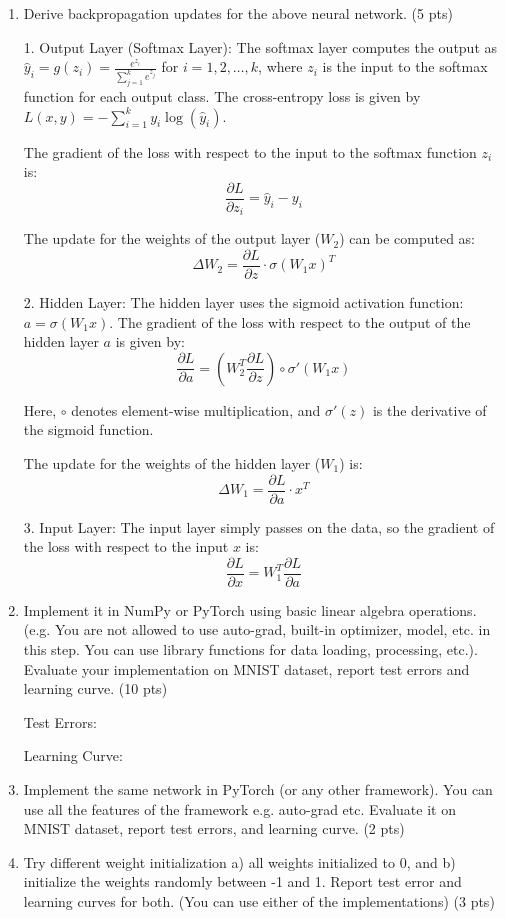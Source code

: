 \documentclass[a4paper]{article}
\theoremstyle{definition}
\newenvironment{soln}{
    \leavevmode\color{blue}\ignorespaces
}{}
\begin{document}
\begin{enumerate}
    \item Derive backpropagation updates for the above neural network. (5 pts) \\
    \begin{soln}
        1. Output Layer (Softmax Layer):
            The softmax layer computes the output as \(\hat{y}_i = g(z_i) = \frac{e^{z_i}}{\sum_{j=1}^k e^{z_j}}\) for \(i = 1, 2, \ldots, k\), where \(z_i\) is the input to the softmax function for each output class. The cross-entropy loss is given by \(L(x, y) = -\sum_{i=1}^k y_i \log(\hat{y}_i)\).

            The gradient of the loss with respect to the input to the softmax function \(z_i\) is:
            \[ \frac{\partial L}{\partial z_i} = \hat{y}_i - y_i \]

            The update for the weights of the output layer (\(W_2\)) can be computed as:
            \[ \Delta W_2 = \frac{\partial L}{\partial z} \cdot \sigma(W_1 x)^T \]

        2. Hidden Layer:
            The hidden layer uses the sigmoid activation function: \(a = \sigma(W_1 x)\). The gradient of the loss with respect to the output of the hidden layer \(a\) is given by:
            \[ \frac{\partial L}{\partial a} = (W_2^T \frac{\partial L}{\partial z}) \circ \sigma'(W_1 x) \]

            Here, \(\circ\) denotes element-wise multiplication, and \(\sigma'(z)\) is the derivative of the sigmoid function.

            The update for the weights of the hidden layer (\(W_1\)) is:
            \[ \Delta W_1 = \frac{\partial L}{\partial a} \cdot x^T \]

        3. Input Layer:
            The input layer simply passes on the data, so the gradient of the loss with respect to the input \(x\) is:
            \[ \frac{\partial L}{\partial x} = W_1^T \frac{\partial L}{\partial a} \]

    \end{soln}
    \item Implement it in NumPy or PyTorch using basic linear algebra operations. (e.g. You are not allowed to use auto-grad, built-in optimizer, model, etc. in this step. You can use library functions for data loading, processing, etc.). Evaluate your implementation on MNIST dataset, report test errors and learning curve. (10 pts)
    \begin{soln}
        Test Errors:


        Learning Curve:
    \end{soln}
    \item Implement the same network in PyTorch (or any other framework). You can use all the features of the framework e.g. auto-grad etc. Evaluate it on MNIST dataset, report test errors, and learning curve. (2 pts)
    
    \item Try different weight initialization a) all weights initialized to 0, and b) initialize the weights randomly between -1 and 1. Report test error and learning curves for both. (You can use either of the implementations) (3 pts)
\end{enumerate}
\end{document}
